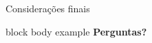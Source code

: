 \documentclass[10pt]{beamer}
\begin{document}
\begin{frame}[b]{Considerações finais}
	\vfill
	\begin{beamercolorbox}[wd=\textwidth,rounded=true,shadow=true]{block body example}
		\vfill
		\centering \textbf{Perguntas?}
		\vspace*{10pt}
	\end{beamercolorbox}
	\vfill
	\doclicenseThis
\end{frame}

%	
%	




%	
\end{document}
